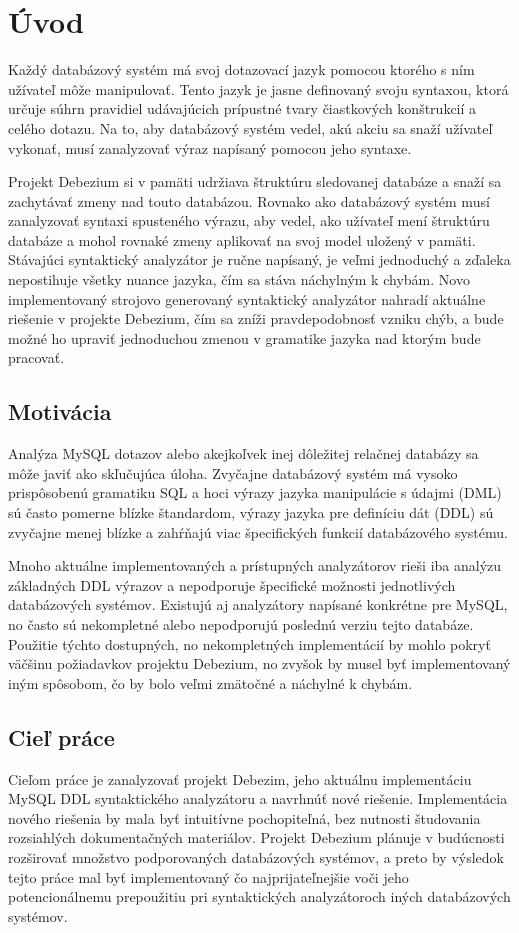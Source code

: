 \chapter{Úvod}
Každý databázový systém má svoj dotazovací jazyk pomocou ktorého s ním užívateľ môže manipulovať. Tento jazyk je jasne definovaný svoju syntaxou, ktorá určuje súhrn pravidiel udávajúcich prípustné tvary čiastkových konštrukcií a celého dotazu. Na to, aby databázový systém vedel, akú akciu sa snaží užívateľ vykonať, musí zanalyzovať výraz napísaný pomocou jeho syntaxe.

Projekt Debezium si v pamäti udržiava štruktúru sledovanej databáze a snaží sa zachytávať zmeny nad touto databázou. Rovnako ako databázový systém musí zanalyzovať syntaxi spusteného výrazu, aby vedel, ako užívateľ mení štruktúru databáze a mohol rovnaké zmeny aplikovať na svoj model uložený v pamäti.
Stávajúci syntaktický analyzátor je ručne napísaný, je veľmi jednoduchý a zďaleka nepostihuje všetky nuance  jazyka, čím sa stáva náchylným k chybám. Novo implementovaný strojovo generovaný syntaktický analyzátor nahradí aktuálne riešenie v projekte Debezium, čím sa zníži pravdepodobnosť vzniku chýb, a bude možné ho upraviť jednoduchou zmenou v gramatike jazyka nad ktorým bude pracovať.

\section{Motivácia}
Analýza MySQL dotazov alebo akejkoľvek inej dôležitej relačnej databázy sa môže javiť ako skľučujúca úloha. Zvyčajne databázový systém má vysoko prispôsobenú gramatiku SQL a hoci výrazy jazyka manipulácie s údajmi (DML) sú často pomerne blízke štandardom, výrazy jazyka pre definíciu dát (DDL) sú zvyčajne menej blízke a zahŕňajú viac špecifických funkcií databázového systému.

Mnoho aktuálne implementovaných a prístupných analyzátorov rieši iba analýzu základných DDL výrazov a nepodporuje špecifické možnosti jednotlivých databázových systémov. Existujú aj analyzátory napísané konkrétne pre MySQL, no často sú nekompletné alebo nepodporujú poslednú verziu tejto databáze. Použitie týchto dostupných, no nekompletných implementácií by mohlo pokryť väčšinu požiadavkov projektu Debezium, no zvyšok by musel byť implementovaný iným spôsobom, čo by bolo veľmi zmätočné a náchylné k chybám.

\section{Cieľ práce}
Cieľom práce je zanalyzovať projekt Debezim, jeho aktuálnu implementáciu MySQL DDL syntaktického analyzátoru a navrhnúť nové riešenie. Implementácia nového riešenia by mala byť intuitívne pochopiteľná, bez nutnosti študovania rozsiahlých dokumentačných materiálov. Projekt Debezium plánuje v budúcnosti rozširovať množstvo podporovaných databázových systémov, a preto by výsledok tejto práce mal byť implementovaný čo najprijateľnejšie voči jeho potencionálnemu prepoužitiu pri syntaktických analyzátoroch iných databázových systémov.
